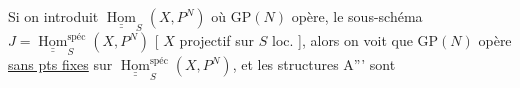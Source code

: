 Si on introduit  $\underline{\underline{\operatorname{Hom}}}_{S}(X,P^{N})$ où $\mathrm{GP}(N)$ opère, le sous-schéma  $J=\underline{\underline{\operatorname{Hom}}}_{S}^{\mathrm{spéc}}(X,P^N)$ [ $X$  projectif sur $S$ loc. ], alors  on voit que $\mathrm{GP}(N)$ opère \uline{sans pts fixes} sur $\underline{\underline{\operatorname{Hom}}}_{S}^{\mathrm{spéc}}(X,P^{N})$, et les structures A''' sont
